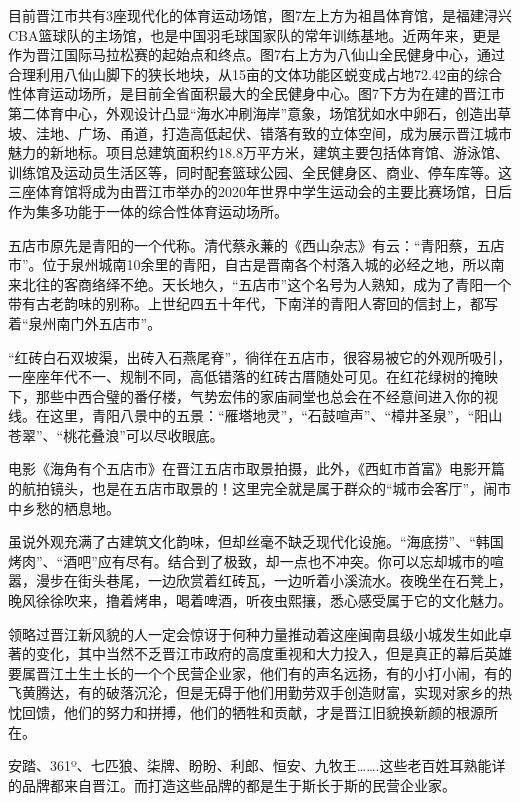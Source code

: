 \documentclass[
]{book}
\begin{document}
目前晋江市共有3座现代化的体育运动场馆，图7左上方为祖昌体育馆，是福建浔兴CBA篮球队的主场馆，也是中国羽毛球国家队的常年训练基地。近两年来，更是作为晋江国际马拉松赛的起始点和终点。图7右上方为八仙山全民健身中心，通过合理利用八仙山脚下的狭长地块，从15亩的文体功能区蜕变成占地72.42亩的综合性体育运动场所，是目前全省面积最大的全民健身中心。图7下方为在建的晋江市第二体育中心，外观设计凸显``海水冲刷海岸''意象，场馆犹如水中卵石，创造出草坡、洼地、广场、甬道，打造高低起伏、错落有致的立体空间，成为展示晋江城市魅力的新地标。项目总建筑面积约18.8万平方米，建筑主要包括体育馆、游泳馆、训练馆及运动员生活区等，同时配套篮球公园、全民健身区、商业、停车库等。这三座体育馆将成为由晋江市举办的2020年世界中学生运动会的主要比赛场馆，日后作为集多功能于一体的综合性体育运动场所。

五店市原先是青阳的一个代称。清代蔡永蒹的《西山杂志》有云：``青阳蔡，五店市''。位于泉州城南10余里的青阳，自古是晋南各个村落入城的必经之地，所以南来北往的客商络绎不绝。天长地久，``五店市''这个名号为人熟知，成为了青阳一个带有古老韵味的别称。上世纪四五十年代，下南洋的青阳人寄回的信封上，都写着``泉州南门外五店市''。

``红砖白石双坡渠，出砖入石燕尾脊''，徜徉在五店市，很容易被它的外观所吸引，一座座年代不一、规制不同，高低错落的红砖古厝随处可见。在红花绿树的掩映下，那些中西合璧的番仔楼，气势宏伟的家庙祠堂也总会在不经意间进入你的视线。在这里，青阳八景中的五景：``雁塔地灵''，``石鼓喧声''、``樟井圣泉''，``阳山苍翠''、``桃花叠浪''可以尽收眼底。

电影《海角有个五店市》在晋江五店市取景拍摄，此外，《西虹市首富》电影开篇的航拍镜头，也是在五店市取景的！这里完全就是属于群众的``城市会客厅''，闹市中乡愁的栖息地。

虽说外观充满了古建筑文化韵味，但却丝毫不缺乏现代化设施。``海底捞''、``韩国烤肉''、``酒吧''应有尽有。结合到了极致，却一点也不冲突。你可以忘却城市的喧嚣，漫步在街头巷尾，一边欣赏着红砖瓦，一边听着小溪流水。夜晚坐在石凳上，晚风徐徐吹来，撸着烤串，喝着啤酒，听夜虫熙攘，悉心感受属于它的文化魅力。

领略过晋江新风貌的人一定会惊讶于何种力量推动着这座闽南县级小城发生如此卓著的变化，其中当然不乏晋江市政府的高度重视和大力投入，但是真正的幕后英雄要属晋江土生土长的一个个民营企业家，他们有的声名远扬，有的小打小闹，有的飞黄腾达，有的破落沉沦，但是无碍于他们用勤劳双手创造财富，实现对家乡的热忱回馈，他们的努力和拼搏，他们的牺牲和贡献，才是晋江旧貌换新颜的根源所在。

安踏、361º、七匹狼、柒牌、盼盼、利郎、恒安、九牧王\ldots\ldots.这些老百姓耳熟能详的品牌都来自晋江。而打造这些品牌的都是生于斯长于斯的民营企业家。
\end{document}
